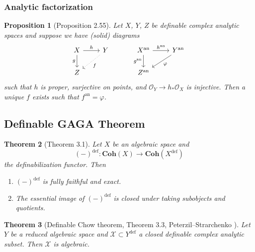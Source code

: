 \documentclass{amsart}
\newtheorem{theorem}{Theorem}[subsection]
\newtheorem{proposition}[theorem]{Proposition}
\theoremstyle{definition}
\numberwithin{equation}{section}
\newcommand{\definable}{\mathrm{def}}
\newcommand{\analytic}{\mathrm{an}}
\begin{document}
\subsubsection{Analytic factorization}
\begin{proposition}[Proposition 2.55] \label{analytic factorization}
  Let $X$, $Y$, $Z$ be definable complex analytic spaces and
  suppose we have (solid) diagrams
  \[
    \begin{tikzcd}
      X \ar[r,"h"] \ar[d,"g"'] & Y\ar[dl,"f",dotted] \\ Z
    \end{tikzcd}
    \hspace*{30pt}
    \begin{tikzcd}
      X^{\analytic} \ar[r,"h^{\analytic}"] \ar[d,"g^{\analytic}"'] & Y^{\analytic}\ar[dl,"\varphi"] \\ Z^{\analytic}
    \end{tikzcd}
  \]
  such that $h$ is proper, surjective on points,
  and $\mathcal{O}_Y \to h_*\mathcal{O}_X$ is injective.
  Then a unique $f$ exists such that $f^{\analytic} = \varphi$.
\end{proposition}

\subsection{Definable GAGA Theorem}
\hfill
\begin{tcolorbox}[title = {\Large Goal}]
  \begin{theorem}[Theorem 3.1]
    \label{def GAGA}
    Let $X$ be an algebraic space and
    \[(-)^{\definable} : \mathbf{Coh}(X) \to \mathbf{Coh}(X^{\definable})\]
    the definabilization functor.
    Then
    \begin{enumerate}[label = {(\arabic*)}]
      \item $(-)^{\definable}$ is fully faithful and exact.
      \item The essential image of $(-)^{\definable}$ is closed under taking subobjects and quotients.
    \end{enumerate}
  \end{theorem}
\end{tcolorbox}

\begin{theorem}[{Definable Chow theorem, Theorem 3.3, Peterzil--Strarchenko \cite[Corollary 4.5]{zbMATH05364146}}]
  Let $Y$ be a reduced algebraic space and
  $\mathcal{X} \subset Y^{\definable}$ a closed definable complex analytic subset.
  Then $\mathcal{X}$ is algebraic.
\end{theorem}
\end{document}
